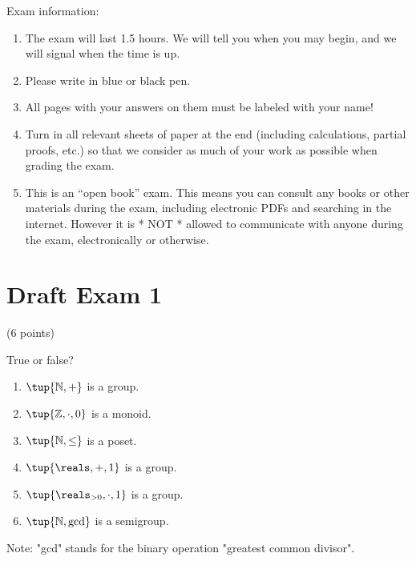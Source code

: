 \documentclass[paper=8.125in:10.250in,pagesize=pdftex,
    headinclude=false,footinclude=false,oneside,egregdoesnotlikesansseriftitles]{kaobook}
\begin{document}
Exam information: 
\begin{enumerate}
\item The exam will last 1.5 hours. We will tell you when you may begin, and we will signal when the time is up. 
\item Please write in blue or black pen. 
\item All pages with your answers on them must be labeled with your name!
\item Turn in all relevant sheets of paper at the end (including calculations, partial proofs, etc.) so that we consider as much of your work as possible when grading the exam. 
\item This is an ``open book'' exam. This means you can consult any books or other materials during the exam, including electronic PDFs and searching in the internet. However it is * NOT * allowed to communicate with anyone during the exam, electronically or otherwise. 
\end{enumerate}

\newpage

\section*{Draft Exam 1}


\begin{gradedexercise}\label{ex:AlgebraicGadgets}
(6 points) 
\

True or false? 
\begin{enumerate}
\item $\tup{\mathbb{N}, +}$ is a group. 
\item $\tup{\mathbb{Z}, \cdot, 0}$ is a monoid. 
\item $\tup{\mathbb{N}, \leq}$ is a poset. 
\item $\tup{\reals, +, 1}$ is a group.
\item $\tup{\reals_{>0}, \cdot, 1}$ is a group. 
\item $\tup{\mathbb{N}, \text{gcd}}$ is a semigroup.
\end{enumerate}
Note: "gcd" stands for the binary operation "greatest common divisor". 
\end{gradedexercise}


\newpage
\end{document}
